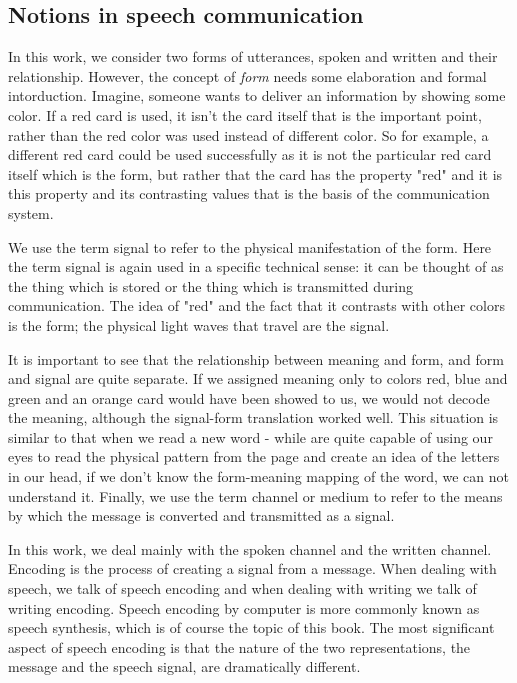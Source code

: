 \subsection{Notions in speech communication}
In this work, we consider two forms of utterances, spoken and written and their relationship.
However, the concept of \textit{form} needs some elaboration and formal intorduction.
Imagine, someone wants to deliver an information by showing some color.
If a red card is used, it isn't the card itself that is the important point, rather than the red color was used instead of different color.
So for example, a different red card could be used successfully  as it
is not the particular red card itself which is the form, but rather that the card has the property "red" and it is this property and its contrasting values that is the basis of the communication system.
\par
We use the term signal to refer to the physical manifestation of the form.
Here the term signal is again used in a specific technical sense: it can be thought of as the thing which is stored or the
thing which is transmitted during communication.
The idea of "red" and the fact that it contrasts with other colors is the form; the physical light waves that travel are the signal.
\par
It is important to see that the relationship between meaning and form, and form and signal
are quite separate.
If we assigned meaning only to colors red, blue and green and an orange card would have been showed to us, we would not decode the meaning, although the signal-form translation worked well.
This situation is similar to that when we read a new word - while are quite capable of using our eyes to read the physical pattern from the page and create an idea of the letters in our head, if we don't know the form-meaning mapping of the word, we can not understand it.
Finally, we use the term channel or medium to refer to the means by which the message
is converted and transmitted as a signal.
\par
In this work, we deal mainly with the spoken channel and the written channel.
Encoding is the process of creating a signal from a message. When dealing with speech, we talk
of speech encoding and when dealing with writing we talk of writing encoding. Speech encoding
by computer is more commonly known as speech synthesis, which is of course the topic of this
book.
The most significant aspect of speech encoding is that the nature of the two representations,
the message and the speech signal, are dramatically different.
